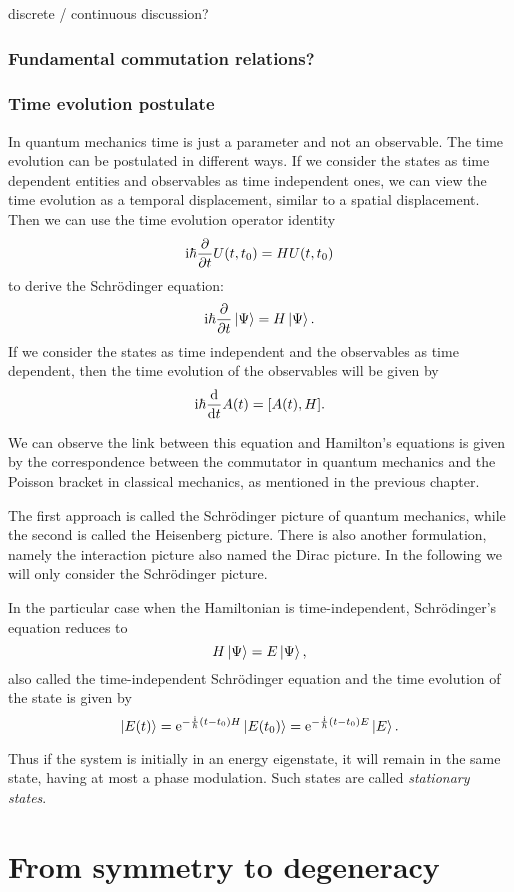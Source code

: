 \documentclass[../thesis.tex]{subfiles}
\theoremstyle{definition}
\begin{document}
{\color{red}discrete / continuous discussion?}

{\color{red}\subsubsection{Fundamental commutation relations?}}

\subsubsection{Time evolution postulate}

In quantum mechanics time is just a parameter and not an observable.
The time evolution can be postulated in different ways.
If we consider the states as time dependent entities and observables as time
independent ones, we can view the time
evolution as a temporal displacement, similar to a spatial displacement.
Then we can use the time evolution operator identity
\[
  \mathrm{i} \hbar \pdv{t} U(t,t_0) = H U(t,t_0)
\]
to derive the Schrödinger equation:
\[
  \mathrm{i} \hbar \pdv{t} \ket{\Psi} = H \ket{\Psi}.
\]
If we consider the states as time independent and the observables as time dependent,
then the time evolution of the observables will be given by
\[
  \mathrm{i} \hbar \dv{t} A(t) = [A(t), H].
\]

We can observe the link between this equation and Hamilton's equations is given
by the correspondence between the commutator in quantum mechanics and the Poisson
bracket in classical mechanics, as mentioned in the previous chapter.

The first approach is called the Schrödinger picture of quantum mechanics, while
the second is called the Heisenberg picture. There is also another formulation,
namely the interaction picture also named the Dirac picture.
In the following we will only consider the Schrödinger picture.

In the particular case when the Hamiltonian is time-independent, Schrödinger's equation
reduces to
\[
  H \ket{\Psi} = E \ket{\Psi},
\]
also called the time-independent Schrödinger equation and the time evolution of
the state is given by
\[
  \ket{E(t)} = \operatorname{e}^{-\frac{\mathrm{i}}{\hbar} (t-t_0) H} \ket{E(t_0)}
             = \operatorname{e}^{-\frac{\mathrm{i}}{\hbar} (t-t_0) E} \ket{E}.
\]

Thus if the system is initially in an energy eigenstate, it will remain in the
same state, having at most a phase modulation. Such states are called
\emph{stationary states}.

\section{From symmetry to degeneracy}
\end{document}
